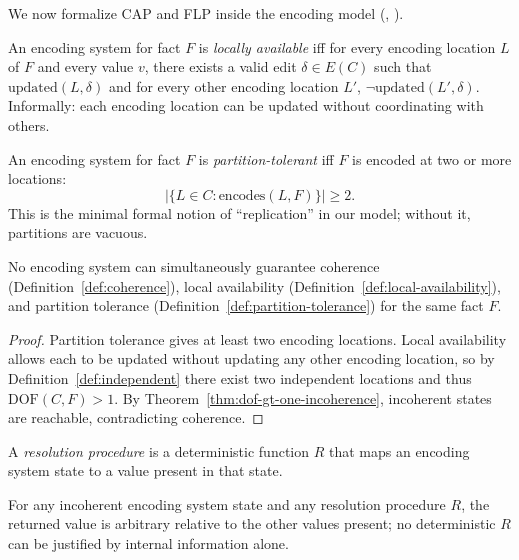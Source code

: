 We now formalize CAP and FLP inside the encoding model (, ).

\begin{definition}\label{def:local-availability}
An encoding system for fact $F$ is \emph{locally available} iff for every encoding location $L$ of $F$ and every value $v$, there exists a valid edit $\delta \in E(C)$ such that $\text{updated}(L, \delta)$ and for every other encoding location $L'$, $\neg \text{updated}(L', \delta)$. Informally: each encoding location can be updated without coordinating with others.
\end{definition}

\begin{definition}\label{def:partition-tolerance}
An encoding system for fact $F$ is \emph{partition-tolerant} iff $F$ is encoded at two or more locations:
\[
|\{L \in C : \text{encodes}(L, F)\}| \ge 2.
\]
This is the minimal formal notion of ``replication'' in our model; without it, partitions are vacuous.
\end{definition}

\begin{theorem}\label{thm:cap-encoding}
No encoding system can simultaneously guarantee coherence (Definition~\ref{def:coherence}), local availability (Definition~\ref{def:local-availability}), and partition tolerance (Definition~\ref{def:partition-tolerance}) for the same fact $F$.
\end{theorem}

\begin{proof}
Partition tolerance gives at least two encoding locations. Local availability allows each to be updated without updating any other encoding location, so by Definition~\ref{def:independent} there exist two independent locations and thus $\text{DOF}(C, F) > 1$. By Theorem~\ref{thm:dof-gt-one-incoherence}, incoherent states are reachable, contradicting coherence.
\end{proof}

\begin{definition}\label{def:resolution-procedure}
A \emph{resolution procedure} is a deterministic function $R$ that maps an encoding system state to a value present in that state.
\end{definition}

\begin{theorem}\label{thm:static-flp}
For any incoherent encoding system state and any resolution procedure $R$, the returned value is arbitrary relative to the other values present; no deterministic $R$ can be justified by internal information alone.
\end{theorem}

